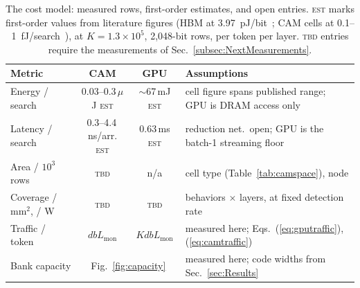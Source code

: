 \documentclass[conference]{IEEEtran}
\newcommand{\cam}{{CAM}\xspace}
\begin{document}
\begin{table}[t]
\centering
\caption{The cost model: measured rows, first-order estimates, and open
entries. \textsc{est} marks first-order values from literature figures
(HBM at 3.97~pJ/bit~\cite{oconnor2017fgdram}; \cam cells at
0.1--1~fJ/search~\cite{pagiamtzis2006cam,ni2019fetcam,liu2022evacam}),
at $K=1.3\!\times\!10^{5}$, 2{,}048-bit rows, per token per layer.
\textsc{tbd} entries require the measurements of
Sec.~\ref{subsec:NextMeasurements}.}
\label{tab:costmodel}
{\scriptsize\setlength{\tabcolsep}{3pt}
\begin{tabular}{@{}lccp{}@{}}
\toprule
\textbf{Metric} & \textbf{CAM} & \textbf{GPU} & \textbf{Assumptions} \\
\midrule
Energy / search & \makecell[l]{0.03--0.3\,$\mu$J\\\textsc{est}} &
  \makecell[l]{$\sim$67\,mJ\\\textsc{est}} &
  cell figure spans published range; GPU is DRAM access only \\
Latency / search & \makecell[l]{0.3--4.4\,ns/arr.\\\textsc{est}} &
  \makecell[l]{0.63\,ms\\\textsc{est}} &
  reduction net.\ open; GPU is the batch-1 streaming floor \\
Area / $10^{3}$ rows & \textsc{tbd} & n/a &
  cell type (Table~\ref{tab:camspace}), node \\
Coverage / mm$^{2}$, / W & \textsc{tbd} & \textsc{tbd} &
  behaviors $\times$ layers, at fixed detection rate \\
Traffic / token & $d b L_{\mathrm{mon}}$ & $K d b L_{\mathrm{mon}}$ &
  measured here; Eqs.~(\ref{eq:gputraffic}), (\ref{eq:camtraffic}) \\
Bank capacity & \multicolumn{2}{c}{Fig.~\ref{fig:capacity}} &
  measured here; code widths from Sec.~\ref{sec:Results} \\
\bottomrule
\end{tabular}}
\end{table}
\end{document}
